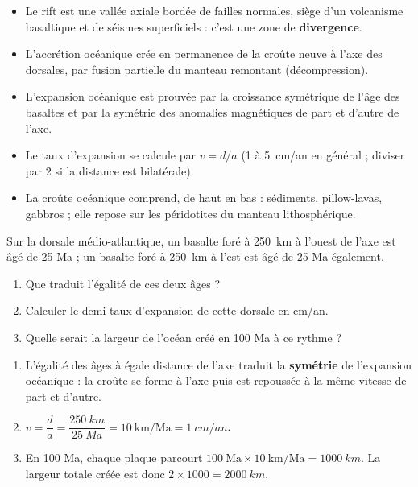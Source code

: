 \documentclass[11pt]{article}
\newcommand{\cle}[1]{{\popxbold\color{popdark}#1}}
\begin{document}
\begin{aretenir}
\begin{itemize}
\item Le \cle{rift} est une vallée axiale bordée de failles normales, siège d'un volcanisme basaltique et de séismes superficiels : c'est une zone de \textbf{divergence}.
\item L'\cle{accrétion océanique} crée en permanence de la croûte neuve à l'axe des dorsales, par fusion partielle du manteau remontant (décompression).
\item L'\cle{expansion océanique} est prouvée par la croissance symétrique de l'âge des basaltes et par la symétrie des anomalies magnétiques de part et d'autre de l'axe.
\item Le taux d'expansion se calcule par $v = d/a$ (1 à \SI{5}{cm/an} en général ; diviser par 2 si la distance est bilatérale).
\item La croûte océanique comprend, de haut en bas : sédiments, pillow-lavas, gabbros ; elle repose sur les péridotites du manteau lithosphérique.
\end{itemize}
\end{aretenir}

\begin{exercice}
Sur la dorsale médio-atlantique, un basalte foré à \SI{250}{km} à l'ouest de l'axe est âgé de 25 Ma ; un basalte foré à \SI{250}{km} à l'est est âgé de 25 Ma également.
\begin{enumerate}
\item Que traduit l'égalité de ces deux âges ?
\item Calculer le demi-taux d'expansion de cette dorsale en cm/an.
\item Quelle serait la largeur de l'océan créé en 100 Ma à ce rythme ?
\end{enumerate}
\end{exercice}

\begin{corrige}[Exercice]
\begin{enumerate}
\item L'égalité des âges à égale distance de l'axe traduit la \textbf{symétrie} de l'expansion océanique : la croûte se forme à l'axe puis est repoussée à la même vitesse de part et d'autre.
\item $v = \dfrac{d}{a} = \dfrac{\SI{250}{km}}{\SI{25}{Ma}} = 10\ \mathrm{km/Ma} = \SI{1}{cm/an}$.
\item En 100 Ma, chaque plaque parcourt $100\ \mathrm{Ma} \times 10\ \mathrm{km/Ma} = \SI{1000}{km}$. La largeur totale créée est donc $2 \times 1000 = \SI{2000}{km}$.
\end{enumerate}
\end{corrige}
\end{document}
